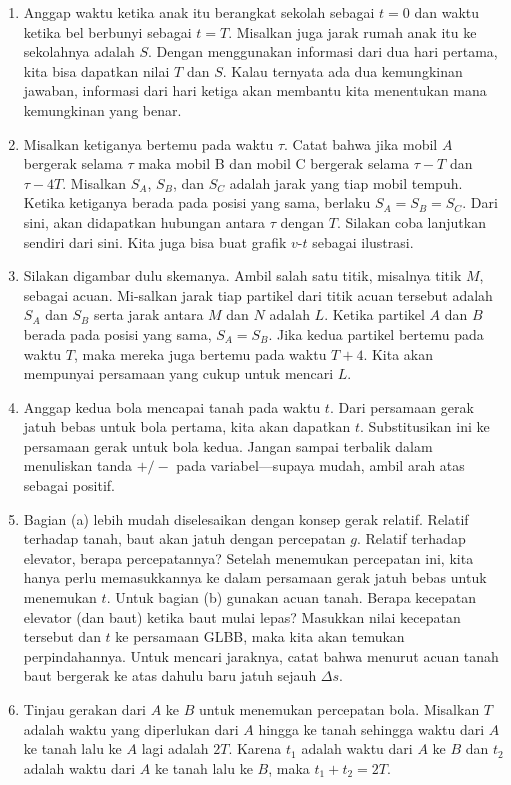 \documentclass[12pt, a4paper]{article}\usepackage[utf8]{inputenc}
\theoremstyle{definition}
\theoremstyle{definition}
\begin{document}
	\begin{enumerate}[label=\arabic*]
		\item Anggap waktu ketika anak itu berangkat sekolah sebagai $t = 0$ dan waktu ketika bel berbunyi sebagai $t = T$. Misalkan juga jarak rumah anak itu ke sekolahnya adalah $S$. Dengan menggunakan informasi dari dua hari pertama, kita bisa dapatkan nilai $T$ dan $S$. Kalau ternyata ada dua kemungkinan jawaban, informasi dari hari ketiga akan membantu kita menentukan mana kemungkinan yang benar.
		\item Misalkan ketiganya bertemu pada waktu $\tau$. Catat bahwa jika mobil $A$ bergerak selama $\tau$ maka mobil B dan mobil C bergerak selama $\tau - T$ dan $\tau - 4T$. Misalkan $S_A$, $S_B$, dan $S_C$ adalah jarak yang tiap mobil tempuh. Ketika ketiganya berada pada posisi yang sama, berlaku $S_A = S_B = S_C$. Dari sini, akan didapatkan hubungan antara $\tau$ dengan $T$. Silakan coba lanjutkan sendiri dari sini. Kita juga bisa buat grafik $v$-$t$ sebagai ilustrasi. 
		\item Silakan digambar dulu skemanya. Ambil salah satu titik, misalnya titik $M$, sebagai acuan. Mi-\linebreak salkan jarak tiap partikel dari titik acuan tersebut adalah $S_A$ dan $S_B$ serta jarak antara $M$ dan $N$ adalah $L$. Ketika partikel $A$ dan $B$ berada pada posisi yang sama, $S_A = S_B$. Jika kedua partikel bertemu pada waktu $T$, maka mereka juga bertemu pada waktu $T + 4$. Kita akan mempunyai persamaan yang cukup untuk mencari $L$.
		\item Anggap kedua bola mencapai tanah pada waktu $t$. Dari persamaan gerak jatuh bebas untuk bola pertama, kita akan dapatkan $t$. Substitusikan ini ke persamaan gerak untuk bola kedua. Jangan sampai terbalik dalam menuliskan tanda $+/-$ pada variabel---supaya mudah, ambil arah atas sebagai positif.
		\item Bagian (a) lebih mudah diselesaikan dengan konsep gerak relatif. Relatif terhadap tanah, baut akan jatuh dengan percepatan $g$. Relatif terhadap elevator, berapa percepatannya? Setelah menemukan percepatan ini, kita hanya perlu memasukkannya ke dalam persamaan gerak jatuh bebas untuk menemukan $t$. Untuk bagian (b) gunakan acuan tanah. Berapa kecepatan elevator (dan baut) ketika baut mulai lepas? Masukkan nilai kecepatan tersebut dan $t$ ke persamaan GLBB, maka kita akan temukan perpindahannya. Untuk mencari jaraknya, catat bahwa menurut acuan tanah baut bergerak ke atas dahulu baru jatuh sejauh $\Delta s$.
		\item Tinjau gerakan dari $A$ ke $B$ untuk menemukan percepatan bola. Misalkan $T$ adalah waktu yang diperlukan dari $A$ hingga ke tanah sehingga waktu dari $A$ ke tanah lalu ke $A$ lagi adalah $2T$. Karena $t_1$ adalah waktu dari $A$ ke $B$ dan $t_2$ adalah waktu dari $A$ ke tanah lalu ke $B$, maka $t_1 + t_2 = 2T$. 

\end{enumerate}
\end{document}
